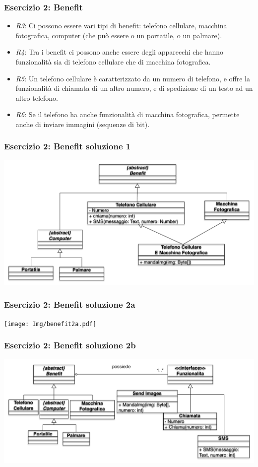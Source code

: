 \documentclass{beamer}
\begin{document}
\begin{frame}
\frametitle{Esercizio 2: Benefit}
\begin{itemize}
\item \emph{R3}: Ci possono essere vari tipi di benefit: telefono cellulare, macchina fotografica, computer (che pu\`o essere o un portatile, o un palmare).
\item \emph{R4}: Tra i benefit ci possono anche essere degli apparecchi che hanno funzionalit\`a sia di telefono cellulare che di macchina fotografica.
\item \emph{R5}: Un telefono cellulare \`e caratterizzato da un numero di telefono, e offre la funzionalit\`a di chiamata di un altro numero, e di spedizione di un testo ad un altro telefono.
\item \emph{R6}: Se il telefono ha anche funzionalit\`a di macchina fotografica, permette anche di inviare immagini (sequenze di bit).
\end{itemize}
\end{frame}

\begin{frame}
\frametitle{Esercizio 2: Benefit soluzione 1}
\includegraphics[scale=0.4]{Img/benefit1.pdf}
\end{frame}

\begin{frame}
\frametitle{Esercizio 2: Benefit soluzione 2a}
\texttt{[image: Img/benefit2a.pdf]}
\end{frame}

\begin{frame}
\frametitle{Esercizio 2: Benefit soluzione 2b}
\includegraphics[scale=0.43]{Img/benefit2.pdf}
\end{frame}
\end{document}
